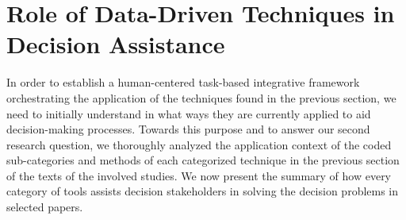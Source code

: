 \documentclass{sfuthesis}
\begin{document}
\section{Role of Data-Driven Techniques in Decision Assistance}
In order to establish a human-centered task-based integrative framework orchestrating the application of the techniques found in the previous section, we need to initially understand in what ways they are currently applied to aid decision-making processes. Towards this purpose and to answer our second research question, we thoroughly analyzed the application context of the coded sub-categories and methods of each categorized technique in the previous section of the texts of the involved studies. We now present the summary of how every category of tools assists decision stakeholders in solving the decision problems in selected papers.\par
\end{document}
